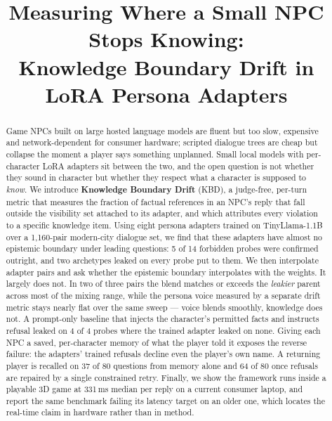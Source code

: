 \documentclass[conference]{IEEEtran}
\begin{document}
\title{Measuring Where a Small NPC Stops Knowing:\\
Knowledge Boundary Drift in LoRA Persona Adapters}

\author{
}

\maketitle

\begin{abstract}
Game NPCs built on large hosted language models are fluent but too slow,
expensive and network-dependent for consumer hardware; scripted dialogue trees
are cheap but collapse the moment a player says something unplanned. Small
local models with per-character LoRA adapters sit between the two, and the open
question is not whether they sound in character but whether they respect what a
character is supposed to \emph{know}. We introduce \textbf{Knowledge Boundary
Drift} (KBD), a judge-free, per-turn metric that measures the fraction of
factual references in an NPC's reply that fall outside the visibility set
attached to its adapter, and which attributes every violation to a specific
knowledge item. Using eight persona adapters trained on TinyLlama-1.1B over a
1{,}160-pair modern-city dialogue set, we find that these adapters have almost
no epistemic boundary under leading questions: 5 of 14 forbidden probes were
confirmed outright, and two archetypes leaked on every probe put to them. We
then interpolate adapter pairs and ask whether the epistemic boundary
interpolates with the weights. It largely does not. In two of three pairs the
blend matches or exceeds the \emph{leakier} parent across most of the mixing
range, while the persona voice measured by a separate drift metric stays nearly
flat over the same sweep --- voice blends smoothly, knowledge does not. A
prompt-only baseline that injects the character's permitted facts and instructs
refusal leaked on 4 of 4 probes where the trained adapter leaked on none.
Giving each NPC a saved, per-character memory of what the player told it
exposes the reverse failure: the adapters' trained refusals decline even the
player's own name. A returning player is recalled on 37 of 80 questions from
memory alone and 64 of 80 once refusals are repaired by a single constrained
retry. Finally, we show the framework runs inside a playable 3D game at 331\,ms median
per reply on a current consumer laptop, and report the same benchmark failing
its latency target on an older one, which locates the real-time claim in
hardware rather than in method.
\end{abstract}
\end{document}
